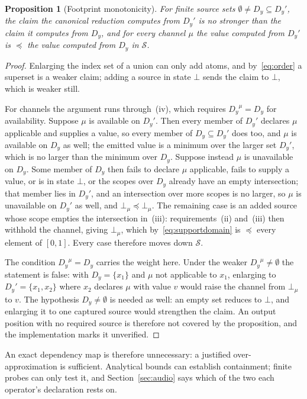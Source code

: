 \documentclass[preprint,3p,11pt,authoryear]{elsarticle}
\newtheorem{proposition}{Proposition}
\newcommand{\Dy}{\ensuremath{D_y}}
\begin{document}
\begin{proposition}[Footprint monotonicity]
\label{prop:footprint}
For finite source sets $\emptyset \neq \Dy \subseteq \Dy'$, the claim the
canonical reduction computes from $\Dy'$ is no stronger than the claim it
computes from $\Dy$, and for every channel $\mu$ the value computed from $\Dy'$
is $\preceq$ the value computed from $\Dy$ in $\mathcal{S}$.
\end{proposition}
\begin{proof}
Enlarging the index set of a union can only add atoms, and by~\eqref{eq:order}
a superset is a weaker claim; adding a source in state $\bot$ sends the claim to
$\bot$, which is weaker still.

For channels the argument runs through~(iv), which requires
$\Dy^{\mu} = \Dy$ for availability. Suppose $\mu$ is available on $\Dy'$. Then
every member of $\Dy'$ declares $\mu$ applicable and supplies a value, so every
member of $\Dy \subseteq \Dy'$ does too, and $\mu$ is available on $\Dy$ as
well; the emitted value is a minimum over the larger set $\Dy'$, which is no
larger than the minimum over $\Dy$. Suppose instead $\mu$ is unavailable on
$\Dy$. Some member of $\Dy$ then fails to declare $\mu$ applicable, fails to
supply a value, or is in state $\bot$, or the scopes over $\Dy$ already have an
empty intersection; that member lies in $\Dy'$, and an intersection over more
scopes is no larger, so $\mu$ is unavailable on $\Dy'$ as well, and
$\bot_{\mu} \preceq \bot_{\mu}$. The
remaining case is an added source whose scope empties the intersection
in~(iii): requirements~(ii) and~(iii) then withhold the channel, giving
$\bot_{\mu}$, which by~\eqref{eq:supportdomain} is $\preceq$ every element of
$[0,1]$. Every case therefore moves down $\mathcal{S}$.

The condition $\Dy^{\mu} = \Dy$ carries the weight here. Under the weaker
$\Dy^{\mu} \neq \emptyset$ the statement is false: with $\Dy = \{x_1\}$ and
$\mu$ not applicable to $x_1$, enlarging to $\Dy' = \{x_1, x_2\}$ where $x_2$
declares $\mu$ with value $v$ would raise the channel from $\bot_{\mu}$ to $v$.
The hypothesis $\Dy \neq \emptyset$ is needed as well: an empty set reduces to
$\bot$, and enlarging it to one captured source would strengthen the claim. An
output position with no required source is therefore not covered by the
proposition, and the implementation marks it unverified.
\end{proof}

An exact dependency map is therefore unnecessary: a justified
over-approximation is sufficient. Analytical bounds can establish containment;
finite probes can only test it, and Section~\ref{sec:audio} says which of the
two each operator's declaration rests on.
\end{document}
